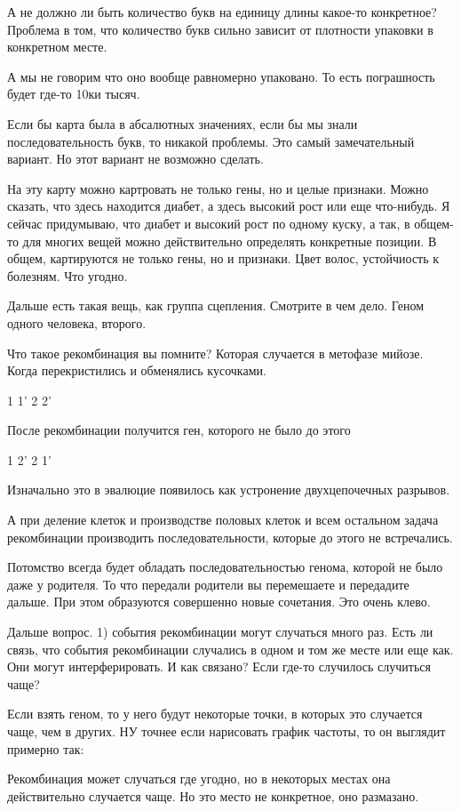 А не должно ли быть количество букв на единицу длины какое-то конкретное?
Проблема в том, что количество букв сильно зависит от плотности упаковки в
конкретном месте.

А мы не говорим что оно вообще равномерно упаковано. То есть
пограшность будет где-то 10ки тысяч.

Если бы карта была в абсалютных значениях,
если бы мы знали последовательность букв,
то никакой проблемы. Это самый замечательный вариант.
Но этот вариант не возможно сделать.

На эту карту можно картровать не только гены, но и
целые признаки. Можно сказать, что здесь находится диабет,
а здесь высокий рост или еще что-нибудь.
Я сейчас придумываю, что диабет и высокий рост
по одному куску, а так, в общем-то
для многих
вещей можно действительно определять конкретные позиции.
В общем, картируются не только гены, но и признаки. Цвет
волос, устойчиость к болезням. Что угодно.


Дальше есть такая вещь, как группа сцепления.
Смотрите в чем дело.
Геном одного человека, второго.

Что такое рекомбинация вы помните? Которая
случается в метофазе мийозе. Когда
перекристились и обменялись кусочками.

1 1'
2 2'

После рекомбинации получится ген, 
которого не было до этого 

1 2'
2 1'

Изначально это в эвалюцие появилось 
как устронение двухцепочечных разрывов. 

А при деление клеток и производстве половых клеток и всем
остальном задача рекомбинации производить 
последовательности, которые до этого не встречались. 

Потомство всегда будет обладать последовательностью 
генома, которой не было даже у
родителя. То что передали родители 
вы перемешаете и передадите дальше. При этом 
образуются совершенно новые сочетания. Это очень 
клево. 

Дальше вопрос. 
1) события рекомбинации могут случаться много раз. Есть 
ли связь, что события рекомбинации случались в одном и том же месте
или еще как. Они могут интерферировать. И как связано? 
Если где-то случилось случиться чаще? 

Если взять геном, то у него будут некоторые точки, 
в которых это случается чаще, чем в других. 
НУ точнее если нарисовать график частоты, то 
он выглядит примерно так:

Рекомбинация может случаться где угодно, но в некоторых 
местах она действительно случается чаще. Но это 
место не конкретное, оно размазано. 

